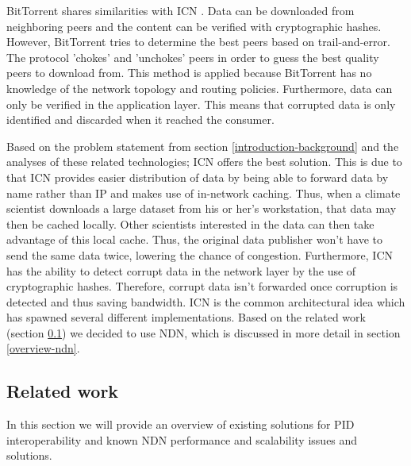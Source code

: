 BitTorrent shares similarities with ICN \cite{mastorakis2017ntorrent}. Data can be downloaded from neighboring peers and the content can be verified with cryptographic hashes. However, BitTorrent tries to determine the best peers based on trail-and-error. The protocol 'chokes' and 'unchokes' peers in order to guess the best quality peers to download from. This method is applied because BitTorrent has no knowledge of the network topology and routing policies. Furthermore, data can only be verified in the application layer. This means that corrupted data is only identified and discarded when it reached the consumer. 

Based on the problem statement from section \ref{introduction-background} and the analyses of these related technologies; ICN offers the best solution. This is due to that ICN provides easier distribution of data by being able to forward data by name rather than IP and makes use of in-network caching. Thus, when a climate scientist downloads a large dataset from his or her's workstation, that data may then be cached locally. Other scientists interested in the data can then take advantage of this local cache. Thus, the original data publisher won't have to send the same data twice, lowering the chance of congestion. Furthermore, ICN has the ability to detect corrupt data in the network layer by the use of cryptographic hashes. Therefore, corrupt data isn't forwarded once corruption is detected and thus saving bandwidth. ICN is the common architectural idea which has spawned several different implementations. Based on the related work (section \ref{introduction-related-work}) we decided to use NDN, which is discussed in more detail in section \ref{overview-ndn}.

\subsection{Related work}
\label{introduction-related-work}


In this section we will provide an overview of existing solutions for PID interoperability and known NDN performance and scalability issues and solutions.

